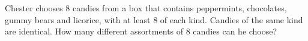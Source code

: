 Chester chooses $8$ candies from a box that contains peppermints, chocolates, gummy bears and licorice, with at least $8$ of each kind. Candies of the same kind are identical. How many different assortments of $8$ candies can he choose?
